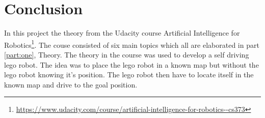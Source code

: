 \chapter{Conclusion}
\label{chp:conc}

In this project the theory from the Udacity course Artificial Intelligence for Robotics\footnote{\url{https://www.udacity.com/course/artificial-intelligence-for-robotics--cs373}}. The couse consisted of six main topics which all are elaborated in part \ref{part:one}, Theory. The theory in the course was used to develop a self driving lego robot. The idea was to place the lego robot in a known map but without the lego robot knowing it's position. The lego robot then have to locate itself in the known map and drive to the goal position.